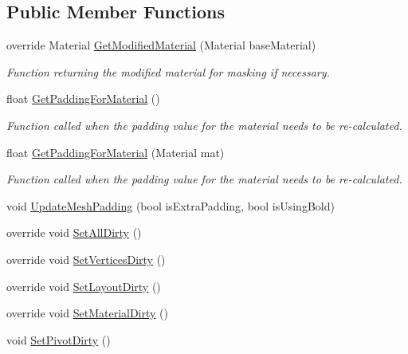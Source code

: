 \subsection*{Public Member Functions}
\begin{DoxyCompactItemize}
\item 
override Material \mbox{\hyperlink{class_t_m_pro_1_1_t_m_p___sub_mesh_u_i_a687aa0d711bf32e50c11a403493c2667}{Get\+Modified\+Material}} (Material base\+Material)
\begin{DoxyCompactList}\small\item\em Function returning the modified material for masking if necessary. \end{DoxyCompactList}\item 
float \mbox{\hyperlink{class_t_m_pro_1_1_t_m_p___sub_mesh_u_i_a7d5c58041ab5f14071b3a39108bd3408}{Get\+Padding\+For\+Material}} ()
\begin{DoxyCompactList}\small\item\em Function called when the padding value for the material needs to be re-\/calculated. \end{DoxyCompactList}\item 
float \mbox{\hyperlink{class_t_m_pro_1_1_t_m_p___sub_mesh_u_i_a0039a3effee201741725425d2376c801}{Get\+Padding\+For\+Material}} (Material mat)
\begin{DoxyCompactList}\small\item\em Function called when the padding value for the material needs to be re-\/calculated. \end{DoxyCompactList}\item 
void \mbox{\hyperlink{class_t_m_pro_1_1_t_m_p___sub_mesh_u_i_a0f39c16f271cb73553d4b1917a9fe4ba}{Update\+Mesh\+Padding}} (bool is\+Extra\+Padding, bool is\+Using\+Bold)
\item 
override void \mbox{\hyperlink{class_t_m_pro_1_1_t_m_p___sub_mesh_u_i_abb694c1dd941ef112c04d913fb460044}{Set\+All\+Dirty}} ()
\item 
override void \mbox{\hyperlink{class_t_m_pro_1_1_t_m_p___sub_mesh_u_i_a2597031429dd905eb468c86df32850a8}{Set\+Vertices\+Dirty}} ()
\item 
override void \mbox{\hyperlink{class_t_m_pro_1_1_t_m_p___sub_mesh_u_i_af0fb2011a25e14eab43fe51adbc62cbb}{Set\+Layout\+Dirty}} ()
\item 
override void \mbox{\hyperlink{class_t_m_pro_1_1_t_m_p___sub_mesh_u_i_a5aae214407f49b19377ba6b3c99bd3e9}{Set\+Material\+Dirty}} ()
\item 
void \mbox{\hyperlink{class_t_m_pro_1_1_t_m_p___sub_mesh_u_i_a9db1f46942567925b79b2290171bd24a}{Set\+Pivot\+Dirty}} ()

\end{DoxyCompactItemize}
